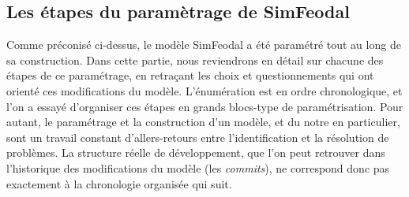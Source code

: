 	\subsection{Les étapes du paramètrage de SimFeodal}
	
	Comme préconisé ci-dessus, le modèle SimFeodal a été paramétré tout au long de sa construction. Dans cette partie, nous reviendrons en détail sur chacune des étapes de ce paramétrage, en retraçant les choix et questionnements qui ont orienté ces modifications du modèle. L'énumération est en ordre chronologique, et l'on a essayé d'organiser ces étapes en grands blocs-type de paramétrisation. Pour autant, le paramétrage et la construction d'un modèle, et du notre en particulier, sont un travail constant d'allers-retours entre l'identification et la résolution de problèmes. La structure réelle de développement, que l'on peut retrouver dans l'historique des modifications du modèle (les \og \textit{commits}\fg{}), ne correspond donc pas exactement à la chronologie organisée qui suit.
	
